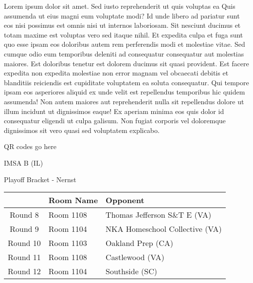 \documentclass{article}%
\begin{document}
\vspace*{8pt}%
\linebreak%
\newline%
\newline%
Lorem ipsum dolor sit amet. Sed iusto reprehenderit ut quis voluptas ea Quis assumenda ut eius magni eum voluptate modi? Id unde libero ad pariatur sunt eos nisi possimus est omnis nisi ut internos laboriosam. Sit nesciunt ducimus et totam maxime est voluptas vero sed itaque nihil. Et expedita culpa et fuga sunt quo esse ipsam eos doloribus autem rem perferendis modi et molestiae vitae.\newline%
\newline%
Sed cumque odio eum temporibus deleniti ad consequatur consequatur aut molestias maiores. Est doloribus tenetur est dolorem ducimus sit quasi provident. Est facere expedita non expedita molestiae non error magnam vel obcaecati debitis et blanditiis reiciendis est cupiditate voluptatem ea soluta consequatur. Qui tempore ipsam eos asperiores aliquid ex unde velit est repellendus temporibus hic quidem assumenda!\newline%
\newline%
Non autem maiores aut reprehenderit nulla sit repellendus dolore ut illum incidunt ut dignissimos eaque! Ex aperiam minima eos quis dolor id consequatur eligendi ut culpa galisum. Non fugiat corporis vel doloremque dignissimos sit vero quasi sed voluptatem explicabo.\newline%
\newline%
%
\vspace*{30pt}%
\begin{center}%
\begin{Huge}%
QR codes go here%
\end{Huge}%
\end{center}%
\newpage%
\begin{center}%
\begin{Huge}%
IMSA B (IL)%
\end{Huge}%
\vspace*{8pt}%
\linebreak%
\begin{Large}%
Playoff Bracket {-} Nernst%
\end{Large}%
\end{center}%
%
\begin{tabularx}{\textwidth}{|c|Y|Y|}%
\hline%
&Room Name&Opponent\\%
\hline%
Round 8&Room 1108&Thomas Jefferson S\&T E (VA)\\%
Round 9&Room 1104&NKA Homeschool Collective (VA)\\%
Round 10&Room 1103&Oakland Prep (CA)\\%
Round 11&Room 1108&Castlewood (VA)\\%
Round 12&Room 1104&Southside (SC)\\%
\hline%
\end{tabularx}%
\end{document}
